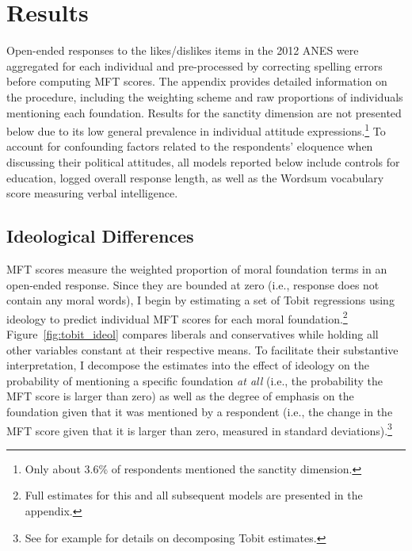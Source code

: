 \documentclass[12pt]{article}
\begin{document}
\section*{Results}

Open-ended responses to the likes/dislikes items in the 2012 ANES were aggregated for each individual and pre-processed by correcting spelling errors before computing MFT scores. The appendix provides detailed information on the procedure, including the weighting scheme and raw proportions of individuals mentioning each foundation. Results for the sanctity dimension are not presented below due to its low general prevalence in individual attitude expressions.\footnote{Only about 3.6\% of respondents mentioned the sanctity dimension.} To account for confounding factors related to the respondents' eloquence when discussing their political attitudes, all models reported below include controls for education, logged overall response length, as well as the Wordsum vocabulary score measuring verbal intelligence.


\subsection*{Ideological Differences}

MFT scores measure the weighted proportion of moral foundation terms in an open-ended response. Since they are bounded at zero (i.e., response does not contain any moral words), I begin by estimating a set of Tobit regressions using ideology to predict individual MFT scores for each moral foundation.\footnote{Full estimates for this and all subsequent models are presented in the appendix.} Figure~\ref{fig:tobit_ideol} compares liberals and conservatives while holding all other variables constant at their respective means. To facilitate their substantive interpretation, I decompose the estimates into the effect of ideology on the probability of mentioning a specific foundation \textit{at all} (i.e., the probability the MFT score is larger than zero) as well as the degree of emphasis on the foundation given that it was mentioned by a respondent (i.e., the change in the MFT score given that it is larger than zero, measured in standard deviations).\footnote{See for example \citet{mcdonald1980uses} for details on decomposing Tobit estimates.}
\end{document}
